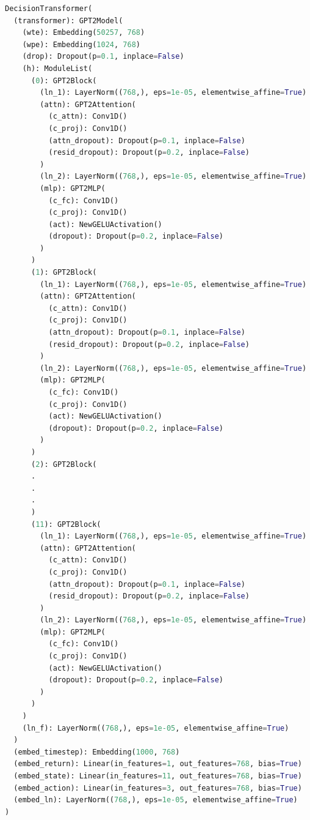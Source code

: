 \documentclass{article}
\begin{document}
\begin{lstlisting}[language=Python, caption=Model architecture.]
DecisionTransformer(
  (transformer): GPT2Model(
    (wte): Embedding(50257, 768)
    (wpe): Embedding(1024, 768)
    (drop): Dropout(p=0.1, inplace=False)
    (h): ModuleList(
      (0): GPT2Block(
        (ln_1): LayerNorm((768,), eps=1e-05, elementwise_affine=True)
        (attn): GPT2Attention(
          (c_attn): Conv1D()
          (c_proj): Conv1D()
          (attn_dropout): Dropout(p=0.1, inplace=False)
          (resid_dropout): Dropout(p=0.2, inplace=False)
        )
        (ln_2): LayerNorm((768,), eps=1e-05, elementwise_affine=True)
        (mlp): GPT2MLP(
          (c_fc): Conv1D()
          (c_proj): Conv1D()
          (act): NewGELUActivation()
          (dropout): Dropout(p=0.2, inplace=False)
        )
      )
      (1): GPT2Block(
        (ln_1): LayerNorm((768,), eps=1e-05, elementwise_affine=True)
        (attn): GPT2Attention(
          (c_attn): Conv1D()
          (c_proj): Conv1D()
          (attn_dropout): Dropout(p=0.1, inplace=False)
          (resid_dropout): Dropout(p=0.2, inplace=False)
        )
        (ln_2): LayerNorm((768,), eps=1e-05, elementwise_affine=True)
        (mlp): GPT2MLP(
          (c_fc): Conv1D()
          (c_proj): Conv1D()
          (act): NewGELUActivation()
          (dropout): Dropout(p=0.2, inplace=False)
        )
      )
      (2): GPT2Block(
      .
      .
      .
      )
      (11): GPT2Block(
        (ln_1): LayerNorm((768,), eps=1e-05, elementwise_affine=True)
        (attn): GPT2Attention(
          (c_attn): Conv1D()
          (c_proj): Conv1D()
          (attn_dropout): Dropout(p=0.1, inplace=False)
          (resid_dropout): Dropout(p=0.2, inplace=False)
        )
        (ln_2): LayerNorm((768,), eps=1e-05, elementwise_affine=True)
        (mlp): GPT2MLP(
          (c_fc): Conv1D()
          (c_proj): Conv1D()
          (act): NewGELUActivation()
          (dropout): Dropout(p=0.2, inplace=False)
        )
      )
    )
    (ln_f): LayerNorm((768,), eps=1e-05, elementwise_affine=True)
  )
  (embed_timestep): Embedding(1000, 768)
  (embed_return): Linear(in_features=1, out_features=768, bias=True)
  (embed_state): Linear(in_features=11, out_features=768, bias=True)
  (embed_action): Linear(in_features=3, out_features=768, bias=True)
  (embed_ln): LayerNorm((768,), eps=1e-05, elementwise_affine=True)
)
\end{lstlisting}
\end{document}
